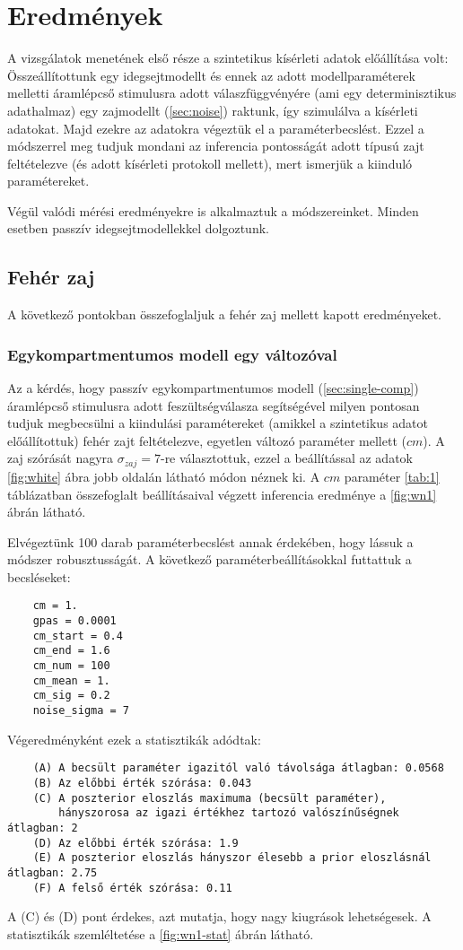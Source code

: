 \section{Eredmények}
A vizsgálatok menetének első része a szintetikus kísérleti adatok előállítása volt: Összeállítottunk egy idegsejtmodellt és ennek az adott modellparaméterek melletti áramlépcső stimulusra adott válaszfüggvényére (ami egy determinisztikus adathalmaz) egy zajmodellt (\ref{sec:noise}) raktunk, így szimulálva a kísérleti adatokat. Majd ezekre az adatokra végeztük el a paraméterbecslést. Ezzel a módszerrel meg tudjuk mondani az inferencia pontosságát adott típusú zajt feltételezve (és adott kísérleti protokoll mellett), mert ismerjük a kiinduló paramétereket.

Végül valódi mérési eredményekre is alkalmaztuk a módszereinket. Minden esetben passzív idegsejtmodellekkel dolgoztunk.

\subsection{Fehér zaj}
A következő pontokban összefoglaljuk a fehér zaj mellett kapott eredményeket.
\subsubsection{Egykompartmentumos modell egy változóval}
Az a kérdés, hogy passzív egykompartmentumos modell (\ref{sec:single-comp}) áramlépcső stimulusra adott feszültségválasza segítségével milyen pontosan tudjuk megbecsülni a kiindulási paramétereket (amikkel a szintetikus adatot előállítottuk) fehér zajt feltételezve, egyetlen változó paraméter mellett ($cm$). A zaj szórását nagyra $\sigma_{zaj} = 7$-re választottuk, ezzel a beállítással az adatok \ref{fig:white} ábra jobb oldalán látható módon néznek ki. A $cm$ paraméter \ref{tab:1} táblázatban összefoglalt beállításaival végzett inferencia eredménye a \ref{fig:wn1} ábrán látható.

Elvégeztünk 100 darab paraméterbecslést annak érdekében, hogy lássuk a módszer robusztusságát. A következő paraméterbeállításokkal futtattuk a becsléseket:
\begin{verbatim}
	cm = 1.
	gpas = 0.0001
	cm_start = 0.4
	cm_end = 1.6
	cm_num = 100
	cm_mean = 1.
	cm_sig = 0.2
	noise_sigma = 7
\end{verbatim}
Végeredményként ezek a statisztikák adódtak:

\begin{verbatim}
	(A) A becsült paraméter igazitól való távolsága átlagban: 0.0568
	(B) Az előbbi érték szórása: 0.043
	(C) A poszterior eloszlás maximuma (becsült paraméter), 
	    hányszorosa az igazi értékhez tartozó valószínűségnek átlagban: 2
	(D) Az előbbi érték szórása: 1.9
	(E) A poszterior eloszlás hányszor élesebb a prior eloszlásnál átlagban: 2.75
	(F) A felső érték szórása: 0.11	
\end{verbatim}
A (C) és (D) pont érdekes, azt mutatja, hogy nagy kiugrások lehetségesek. A statisztikák szemléltetése a \ref{fig:wn1-stat} ábrán látható. 


